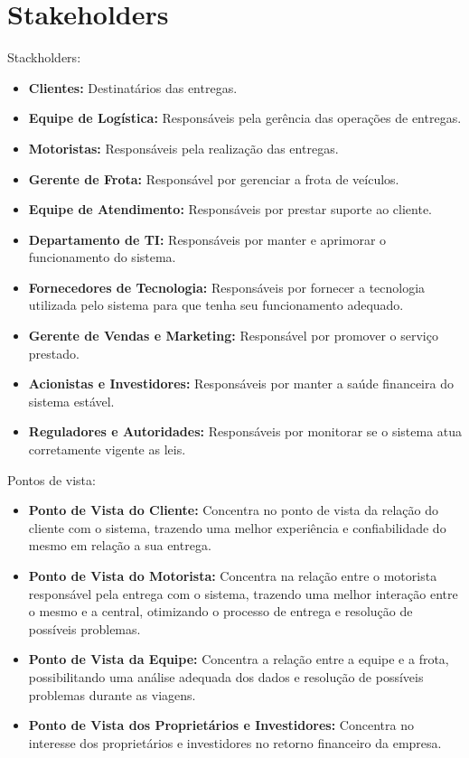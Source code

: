 \section{Stakeholders}
Stackholders: 
\begin{itemize}
	\item \textbf{Clientes:} Destinatários das entregas.
	\item \textbf{Equipe de Logística:} Responsáveis pela gerência das operações de entregas.
	\item \textbf{Motoristas:} Responsáveis pela realização das entregas.
	\item \textbf{Gerente de Frota:} Responsável por gerenciar a frota de veículos.
	\item \textbf{Equipe de Atendimento:} Responsáveis por prestar suporte ao cliente.
	\item \textbf{Departamento de TI:} Responsáveis por manter e aprimorar o funcionamento do sistema.
	\item \textbf{Fornecedores de Tecnologia:} Responsáveis por fornecer a tecnologia utilizada pelo sistema para que tenha seu funcionamento adequado.
	\item \textbf{Gerente de Vendas e Marketing:} Responsável por promover o serviço prestado.
	\item \textbf{Acionistas e Investidores:} Responsáveis por manter a saúde financeira do sistema estável.
	\item \textbf{Reguladores e Autoridades:} Responsáveis por monitorar se o sistema atua corretamente vigente as leis.                  
\end{itemize}

Pontos de vista: 
\begin{itemize}
	\item \textbf{Ponto de Vista do Cliente:} Concentra no ponto de vista da relação do cliente com o sistema, trazendo uma melhor experiência e confiabilidade do mesmo em relação a sua entrega.
	
	\item \textbf{Ponto de Vista do Motorista:} Concentra na relação entre o motorista responsável pela entrega com o sistema, trazendo uma melhor interação entre o mesmo e a central, otimizando o processo de entrega e resolução de possíveis problemas.
	
	\item \textbf{Ponto de Vista da Equipe:} Concentra a relação entre a equipe e a frota, possibilitando uma análise adequada dos dados e resolução de possíveis problemas durante as viagens.
	
	\item \textbf{Ponto de Vista dos Proprietários e Investidores:} Concentra no interesse dos proprietários e investidores no retorno financeiro da empresa.
\end{itemize}

